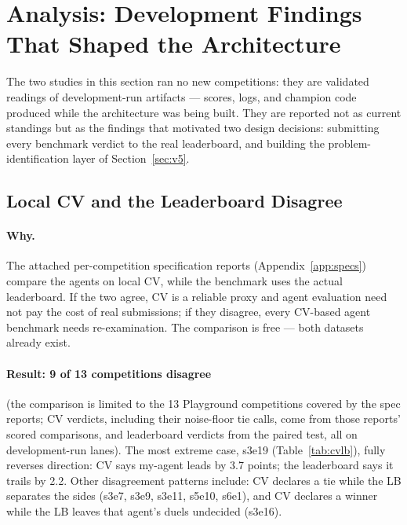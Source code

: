 \documentclass[11pt,a4paper]{article}
\begin{document}
\section{Analysis: Development Findings That Shaped the Architecture}

The two studies in this section ran no new competitions: they are validated readings of
development-run artifacts --- scores, logs, and champion code produced while the architecture
was being built. They are reported not as current standings but as the findings that motivated
two design decisions: submitting every benchmark verdict to the real leaderboard, and building
the problem-identification layer of Section~\ref{sec:v5}.

\subsection{Local CV and the Leaderboard Disagree}
\label{sec:exp3}

\paragraph{Why.} The attached per-competition specification reports (Appendix~\ref{app:specs}) compare the agents on local CV, while the benchmark uses the actual leaderboard. If the two agree, CV is a reliable proxy and agent evaluation need not pay the cost of real submissions; if they disagree, every CV-based agent benchmark needs re-examination. The comparison is free --- both datasets already exist.

\paragraph{Result: 9 of 13 competitions disagree} (the comparison is limited to the 13 Playground competitions covered by the spec reports; CV verdicts, including their noise-floor tie calls, come from those reports' scored comparisons, and leaderboard verdicts from the paired test, all on development-run lanes). The most extreme case, s3e19 (Table~\ref{tab:cvlb}), fully reverses direction: CV says my-agent leads by 3.7 points; the leaderboard says it trails by 2.2. Other disagreement patterns include: CV declares a tie while the LB separates the sides (s3e7, s3e9, s3e11, s5e10, s6e1), and CV declares a winner while the LB leaves that agent's duels undecided (s3e16).
\end{document}
